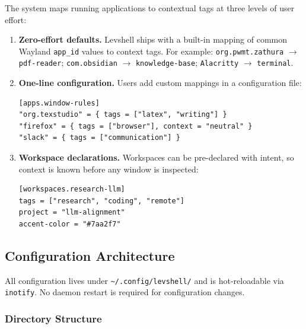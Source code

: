\documentclass[11pt,a4paper]{article}
\begin{document}
The system maps running applications to contextual tags at three levels of user effort:

\begin{enumerate}[leftmargin=1.5em, itemsep=4pt]
  \item \textbf{Zero-effort defaults.} Levshell ships with a built-in mapping of common Wayland \texttt{app\_id} values to context tags. For example: \texttt{org.pwmt.zathura} $\to$ \texttt{pdf-reader}; \texttt{com.obsidian} $\to$ \texttt{knowledge-base}; \texttt{Alacritty} $\to$ \texttt{terminal}.

  \item \textbf{One-line configuration.} Users add custom mappings in a configuration file:
  \begin{lstlisting}[language={}]
[apps.window-rules]
"org.texstudio" = { tags = ["latex", "writing"] }
"firefox" = { tags = ["browser"], context = "neutral" }
"slack" = { tags = ["communication"] }
  \end{lstlisting}

  \item \textbf{Workspace declarations.} Workspaces can be pre-declared with intent, so context is known before any window is inspected:
  \begin{lstlisting}[language={}]
[workspaces.research-llm]
tags = ["research", "coding", "remote"]
project = "llm-alignment"
accent-color = "#7aa2f7"
  \end{lstlisting}
\end{enumerate}


\subsection{Configuration Architecture}
\label{sec:config}

All configuration lives under \texttt{\textasciitilde/.config/levshell/} and is hot-reloadable via \texttt{inotify}. No daemon restart is required for configuration changes.

\subsubsection{Directory Structure}
\end{document}
